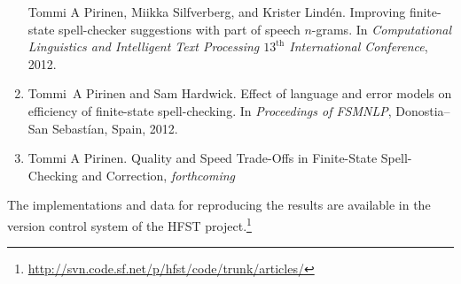 \documentclass[officiallayout,final]{unihelcompling}
\newcommand\misspelt{\bgroup\markoverwith
{\textcolor{red}{\lower3.5pt\hbox{\sixly \char58}}}\ULon}
\begin{document}
\begin{enumerate}
        Tommi A Pirinen, Miikka Silfverberg, and Krister Lindén.
        \newblock Improving finite-state spell-checker suggestions with part of
        speech \(n\)-grams.
        \newblock In {\em Computational Linguistics and Intelligent Text
        Processing $13^{\mathrm{th}}$ International Conference}, 2012.
    \item[\citetalias{pirinen2012effects}]
        Tommi~A Pirinen and Sam Hardwick.
        \newblock Effect of language and error models on
        efficiency of finite-state spell-checking.
        \newblock In {\em Proceedings of FSMNLP}, Donostia--San Sebastían, Spain, 2012.
    \item[\citetalias{pirinen2013quality}]
        Tommi A Pirinen.
        \newblock Quality and Speed Trade-Offs in
        Finite-State Spell-Checking and Correction, {\em forthcoming}
\end{enumerate}

The implementations and data for reproducing the results are available
in the version control system of the HFST
project.\footnote{\url{http://svn.code.sf.net/p/hfst/code/trunk/articles/}}

\tableofcontents

\listoftables

\listoffigures

\listoftodos













\end{document}
